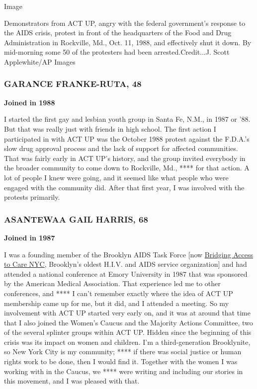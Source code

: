 Image

Demonstrators from ACT UP, angry with the federal government's response
to the AIDS crisis, protest in front of the headquarters of the Food and
Drug Administration in Rockville, Md., Oct. 11, 1988, and effectively
shut it down. By mid-morning some 50 of the protesters had been
arrested.Credit...J. Scott Applewhite/AP Images

\hypertarget{garance-franke-ruta-48}{%
\subsubsection{GARANCE FRANKE-RUTA, 48}\label{garance-franke-ruta-48}}

\textbf{Joined in 1988}

I started the first gay and lesbian youth group in Santa Fe, N.M., in
1987 or '88. But that was really just with friends in high school. The
first action I participated in with ACT UP was the October 1988 protest
against the F.D.A.'s slow drug approval process and the lack of support
for affected communities. That was fairly early in ACT UP's history, and
the group invited everybody in the broader community to come down to
Rockville, Md., **** for that action. A lot of people I knew were going,
and it seemed like what people who were engaged with the community did.
After that first year, I was involved with the protests primarily.

\hypertarget{asantewaa-gail-harris-68}{%
\subsubsection{ASANTEWAA GAIL HARRIS,
68}\label{asantewaa-gail-harris-68}}

\textbf{Joined in 1987}

I was a founding member of the Brooklyn AIDS Task Force {[}now
\href{https://bac-ny.org/}{Bridging Access to Care NYC}, Brooklyn's
oldest H.I.V. and AIDS service organization{]} and had attended a
national conference at Emory University in 1987 that was sponsored by
the American Medical Association. That experience led me to other
conferences, and **** I can't remember exactly where the idea of ACT UP
membership came up for me, but it did, and I attended a meeting. So my
involvement with ACT UP started very early on, and it was at around that
time that I also joined the Women's Caucus and the Majority Actions
Committee, two of the several splinter groups within ACT UP. Hidden
since the beginning of this crisis was its impact on women and children.
I'm a third-generation Brooklynite, so New York City is my community;
**** if there was social justice or human rights work to be done, then I
would find it. Together with the women I was working with in the Caucus,
we **** were writing and including our stories in this movement, and I
was pleased with that.

